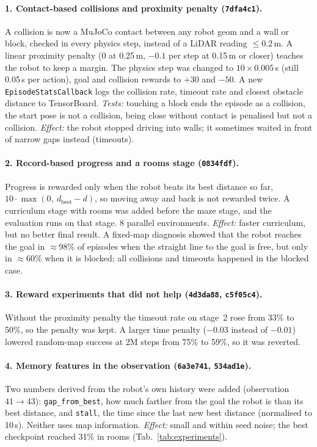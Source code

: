 \documentclass[11pt,a4paper]{article}
\newcommand{\code}[1]{\texttt{#1}}
\begin{document}
\paragraph{1. Contact-based collisions and proximity penalty (\code{7dfa4c1}).}
A collision is now a MuJoCo contact between any robot geom and a wall or
block, checked in every physics step, instead of a LiDAR reading
$\le 0.2$\,m. A linear proximity penalty (0 at 0.25\,m, $-0.1$ per step at
0.15\,m or closer) teaches the robot to keep a margin. The physics step was
changed to $10\times 0.005$\,s (still 0.05\,s per action), goal and collision
rewards to $+30$ and $-50$. A new \code{EpisodeStatsCallback} logs the
collision rate, timeout rate and closest obstacle distance to TensorBoard.
\emph{Tests:} touching a block ends the episode as a collision, the start pose
is not a collision, being close without contact is penalised but not a
collision. \emph{Effect:} the robot stopped driving into walls; it sometimes
waited in front of narrow gaps instead (timeouts).

\paragraph{2. Record-based progress and a rooms stage (\code{0834fdf}).}
Progress is rewarded only when the robot beats its best distance so far,
$10\cdot\max(0,\ d_\text{best}-d)$, so moving away and back is not rewarded
twice. A curriculum stage with rooms was added before the maze stage, and the
evaluation runs on that stage. 8 parallel environments. \emph{Effect:} faster
curriculum, but no better final result. A fixed-map diagnosis showed that the
robot reaches the goal in $\approx$98\% of episodes when the straight line to
the goal is free, but only in $\approx$60\% when it is blocked; all collisions
and timeouts happened in the blocked case.

\paragraph{3. Reward experiments that did not help (\code{4d3da88}, \code{c5f05c4}).}
Without the proximity penalty the timeout rate on stage~2 rose from 33\% to
50\%, so the penalty was kept. A larger time penalty ($-0.03$ instead of
$-0.01$) lowered random-map success at 2M steps from 75\% to 59\%, so it was
reverted.

\paragraph{4. Memory features in the observation (\code{6a3e741}, \code{534ad1e}).}
Two numbers derived from the robot's own history were added (observation
$41\to43$): \code{gap\_from\_best}, how much farther from the goal the robot
is than its best distance, and \code{stall}, the time since the last new best
distance (normalised to 10\,s). Neither uses map information. \emph{Effect:}
small and within seed noise; the best checkpoint reached 31\% in rooms
(Tab.~\ref{tab:experiments}).
\end{document}

